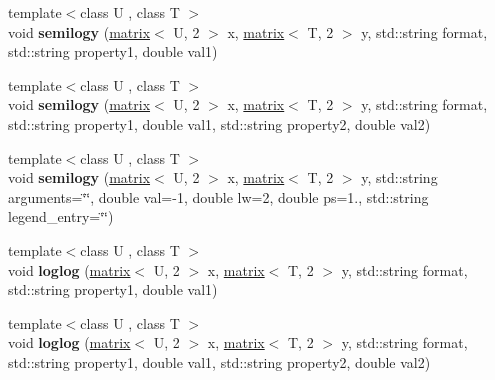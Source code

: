 \begin{DoxyCompactItemize}
\item 
\hypertarget{classkeycpp_1_1_figure_adbd897db5cd03a1ed29aae6b422ed7b5}{{\footnotesize template$<$class U , class T $>$ }\\void {\bfseries semilogy} (\hyperlink{classkeycpp_1_1matrix}{matrix}$<$ U, 2 $>$ x, \hyperlink{classkeycpp_1_1matrix}{matrix}$<$ T, 2 $>$ y, std\-::string format, std\-::string property1, double val1)}\label{classkeycpp_1_1_figure_adbd897db5cd03a1ed29aae6b422ed7b5}

\item 
\hypertarget{classkeycpp_1_1_figure_a44d96582cc3ebec6eeff09c223ca83a1}{{\footnotesize template$<$class U , class T $>$ }\\void {\bfseries semilogy} (\hyperlink{classkeycpp_1_1matrix}{matrix}$<$ U, 2 $>$ x, \hyperlink{classkeycpp_1_1matrix}{matrix}$<$ T, 2 $>$ y, std\-::string format, std\-::string property1, double val1, std\-::string property2, double val2)}\label{classkeycpp_1_1_figure_a44d96582cc3ebec6eeff09c223ca83a1}

\item 
\hypertarget{classkeycpp_1_1_figure_ab49f111139e82abce1ef06653c3b8dee}{{\footnotesize template$<$class U , class T $>$ }\\void {\bfseries semilogy} (\hyperlink{classkeycpp_1_1matrix}{matrix}$<$ U, 2 $>$ x, \hyperlink{classkeycpp_1_1matrix}{matrix}$<$ T, 2 $>$ y, std\-::string arguments=\char`\"{}\char`\"{}, double val=-\/1, double lw=2, double ps=1., std\-::string legend\-\_\-entry=\char`\"{}\char`\"{})}\label{classkeycpp_1_1_figure_ab49f111139e82abce1ef06653c3b8dee}

\item 
\hypertarget{classkeycpp_1_1_figure_a0eed2be747f4168e7a745f58caff46a5}{{\footnotesize template$<$class U , class T $>$ }\\void {\bfseries loglog} (\hyperlink{classkeycpp_1_1matrix}{matrix}$<$ U, 2 $>$ x, \hyperlink{classkeycpp_1_1matrix}{matrix}$<$ T, 2 $>$ y, std\-::string format, std\-::string property1, double val1)}\label{classkeycpp_1_1_figure_a0eed2be747f4168e7a745f58caff46a5}

\item 
\hypertarget{classkeycpp_1_1_figure_a8d51f24a7e32bfddba1f5df1bf0c2c05}{{\footnotesize template$<$class U , class T $>$ }\\void {\bfseries loglog} (\hyperlink{classkeycpp_1_1matrix}{matrix}$<$ U, 2 $>$ x, \hyperlink{classkeycpp_1_1matrix}{matrix}$<$ T, 2 $>$ y, std\-::string format, std\-::string property1, double val1, std\-::string property2, double val2)}\label{classkeycpp_1_1_figure_a8d51f24a7e32bfddba1f5df1bf0c2c05}


\end{DoxyCompactItemize}
